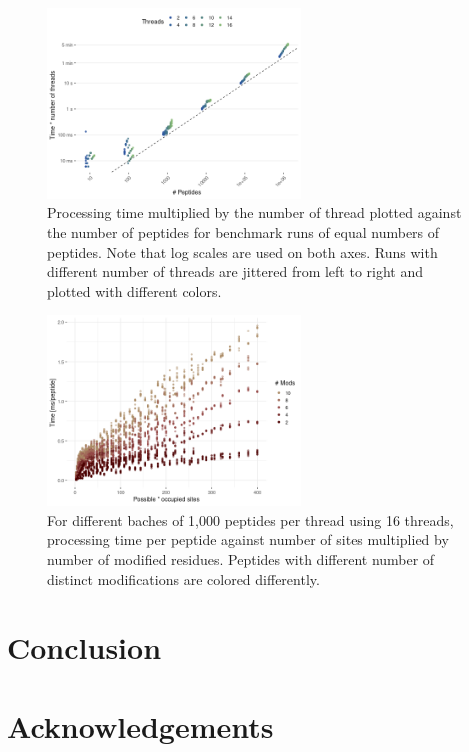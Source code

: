 \documentclass[]{article}
\begin{document}
\begin{figure}[!tpb]
	\centerline{\includegraphics[width=0.6\textwidth]{figures/benchmark_23.02.02_threads.png}}
	\caption{Processing time multiplied by the number of thread plotted against the number of peptides for benchmark runs of equal numbers of peptides. Note that log scales are used on both axes. Runs with different number of threads are jittered from left to right and plotted with different colors.}\label{fig:performance_threads}
\end{figure}


\begin{figure}[!tpb]
\centerline{\includegraphics[width=0.6\textwidth]{figures/benchmark_23.02.02_size.png}}
\caption{For different baches of 1,000 peptides per thread using 16 threads, processing time per peptide against number of sites multiplied by number of modified residues. Peptides with different number of distinct modifications are colored differently.}\label{fig:performance_size}
\end{figure}


\section{Conclusion}


\section{Acknowledgements}
\end{document}
